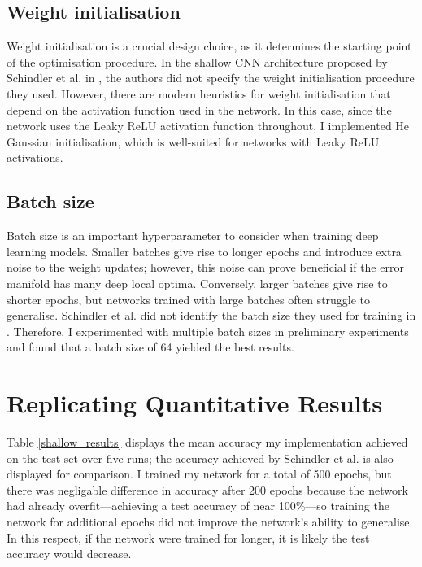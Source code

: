 \documentclass[conference]{IEEEtran}
\begin{document}
\subsection{Weight initialisation}

Weight initialisation is a crucial design choice, as it determines the starting point of the optimisation procedure.
In the shallow CNN architecture proposed by Schindler et al. in \cite{SchindlerLidyRauber}, the authors did not specify the weight initialisation procedure they used.
However, there are modern heuristics for weight initialisation that depend on the activation function used in the network.
In this case, since the network uses the Leaky ReLU activation function throughout, I implemented He Gaussian initialisation, which is well-suited for networks with Leaky ReLU activations.

\subsection{Batch size}

Batch size is an important hyperparameter to consider when training deep learning models.
Smaller batches give rise to longer epochs and introduce extra noise to the weight updates; however, this noise can prove beneficial if the error manifold has many deep local optima.
Conversely, larger batches give rise to shorter epochs, but networks trained with large batches often struggle to generalise.
Schindler et al. did not identify the batch size they used for training in \cite{SchindlerLidyRauber}.
Therefore, I experimented with multiple batch sizes in preliminary experiments and found that a batch size of 64 yielded the best results.

\section{Replicating Quantitative Results}

Table \ref{shallow_results} displays the mean accuracy my implementation achieved on the test set over five runs; the accuracy achieved by Schindler et al. \cite{SchindlerLidyRauber} is also displayed for comparison.
I trained my network for a total of 500 epochs, but there was negligable difference in accuracy after 200 epochs because the network had already overfit---achieving a test accuracy of near 100\%---so training the network for additional epochs did not improve the network's ability to generalise.
In this respect, if the network were trained for longer, it is likely the test accuracy would decrease.
\end{document}
